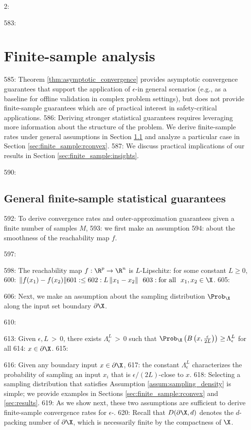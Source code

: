 2: \documentclass[12pt]{l4dc2022} %
\begin{document}
583: \section{Finite-sample analysis}\label{sec:finite_sample}

585: Theorem \ref{thm:asymptotic_convergence} provides asymptotic convergence guarantees that support the application of $\epsilon$-\randup in general scenarios (e.g., as a baseline for offline validation in complex problem settings), but does not provide finite-sample guarantees which are of practical interest in safety-critical applications. 
586: Deriving stronger statistical guarantees requires leveraging more information about the structure of the problem. We derive finite-sample rates under general assumptions in Section \ref{sec:finite_sample:general} and analyze a particular case in Section \ref{sec:finite_sample:rconvex}. 
587: We discuss practical implications of our results in Section \ref{sec:finite_sample:insights}.

590: \subsection{General finite-sample statistical guarantees}\label{sec:finite_sample:general} 

592: To derive convergence rates and outer-approximation guarantees given a finite number of samples $M$, 
593: we first make an assumption   
594: about the smoothness of the reachability map $f$.

597: \begin{myassumption}\label{assum:f:lipschitz}
598: The reachability map $f:\R^p\rightarrow\R^n$ is $L$-Lipschitz: for some constant $L\geq 0$, 
600: $\|f(x_1)-f(x_2)\|
601: \leq
602: L\,\|x_1-x_2\|\  \
603: \text{for all }\ x_1,x_2\in\X$.
605: \end{myassumption}
606: Next, we make an assumption about the sampling distribution $\Prob_\X$ along the input set boundary $\partial\X$.

610: \begin{myassumption}\label{assum:sampling_density}
613: Given $\epsilon,L\,{>}\,0$, there exists $\Lambda_{\epsilon}^{L}\,{>}\,0$ such that $\Prob_\X\left(B\left(x,\frac{\epsilon}{2L}\right)\right)\,{\geq}\, \Lambda_{\epsilon}^{L}$ for all  
614: 	$x\in\partial\X$.
615: \end{myassumption}
616: Given any boundary input $x\in\partial\X$, 
617: the constant $\Lambda_{\epsilon}^{L}$ characterizes the probability of sampling an input $x_i$ that is $\epsilon/(2L)$-close to $x$. 
618: Selecting a sampling distribution that satisfies Assumption \ref{assum:sampling_density} is simple; we provide examples in Sections \ref{sec:finite_sample:rconvex} and \ref{sec:results}. 
619: As we show next, these two assumptions are sufficient to derive finite-sample convergence rates for $\epsilon$-\randup. 
620: Recall that $D(\partial\X, d)$ denotes the $d$-packing number of $\partial\X$, which is necessarily finite by the compactness of $\X$. 
\end{document}
